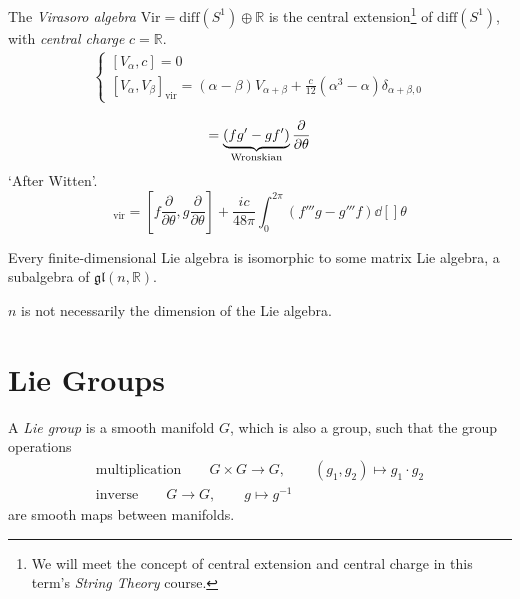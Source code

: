 \begin{example}
  The \emph{Virasoro algebra} $\text{Vir} = \text{diff}(S^1) \oplus \mathbb{R}$ is the central extension\footnote{We will meet the concept of central extension and central charge in this term's \emph{String Theory} course.} of $\text{diff}(S^1)$, with \emph{central charge} $c = \mathbb{R}$.
  \begin{align}
    \left\{
    \begin{gathered}
      [V_{\alpha}, c] = 0 \\
      [V_{\alpha}, V_{\beta}]_{\text{vir}} = (\alpha - \beta) V_{\alpha + \beta} + \frac{c}{12} (\alpha^3 - \alpha) \delta_{\alpha + \beta, 0}
    \end{gathered}
    \right.
  \end{align}
  \begin{remark}
    \begin{equation}
      [f(\theta) \frac{\partial }{\partial \theta}, g(\theta) \frac{\partial }{\partial \theta}] = \underbrace{(f g' - g f')}_{\mathclap{\text{Wronskian}}} \frac{\partial }{\partial \theta}
    \end{equation}
    `After Witten'.
    \begin{equation}
      [f \frac{\partial }{\partial \theta}, g \frac{\partial }{\partial \theta}]_{\text{vir}} = [f \frac{\partial }{\partial \theta}, g \frac{\partial }{\partial \theta}] + \frac{i c}{48 \pi} \int_0^{2 \pi} (f''' g - g''' f) \dd[]{\theta}
    \end{equation}
  \end{remark}
\end{example}

\begin{theorem}[Ado]
  Every finite-dimensional Lie algebra is isomorphic to some matrix Lie algebra, a subalgebra of $\mathfrak{gl}(n, \mathbb{R})$.
\end{theorem}
\begin{leftbar}
  \begin{remark}
    $n$ is not necessarily the dimension of the Lie algebra.
  \end{remark}
\end{leftbar}

\section{Lie Groups}%
\label{sec:lie_groups}

\begin{definition}
  A \emph{Lie group} is a smooth manifold $G$, which is also a group, such that the group operations
  \begin{gather}
    \text{multiplication} \qquad G \times G \to G, \qquad (g_1, g_2) \mapsto g_1 \cdot g_2 \\
    \text{inverse} \qquad G \to G, \qquad g \mapsto g^{-1}
  \end{gather}
  are smooth maps between manifolds.
\end{definition}

